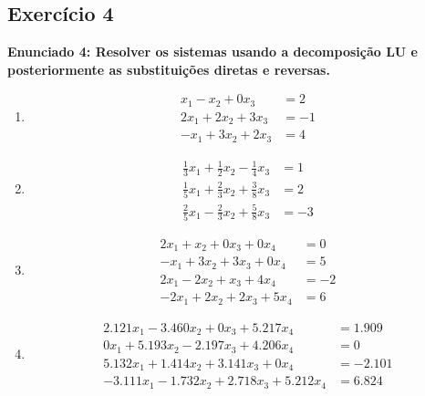 \documentclass{article}
\begin{document}
\subsection*{Exerc\'icio 4}
\textbf{Enunciado 4: Resolver os sistemas usando a decomposi\c{c}\~ao LU e posteriormente as substitui\c{c}\~oes diretas e reversas.}
\begin{enumerate}
    \item 
    \[
        \begin{aligned}
            x_1 - x_2 + 0x_3 &= 2 \\
            2x_1 + 2x_2 + 3x_3 &= -1 \\
            -x_1 + 3x_2 + 2x_3 &= 4
        \end{aligned}
    \]
    \item 
    \[
        \begin{aligned}
            \frac13x_1 + \frac12x_2 - \frac14x_3 &= 1 \\
            \frac15x_1 + \frac23x_2 + \frac38x_3 &= 2 \\
            \frac25x_1 - \frac23x_2 + \frac58x_3 &= -3
        \end{aligned}
    \]
    \item 
    \[
        \begin{aligned}
            2x_1 + x_2 + 0x_3 + 0x_4 &= 0 \\
            -x_1 + 3x_2 + 3x_3 + 0x_4 &= 5 \\
            2x_1 - 2x_2 + x_3 + 4x_4 &= -2 \\
            -2x_1 + 2x_2 + 2x_3 + 5x_4 &= 6
        \end{aligned}
    \]
    \item 
    \[
        \begin{aligned}
            2.121x_1 - 3.460x_2 + 0x_3 + 5.217x_4 &= 1.909 \\
            0x_1 + 5.193x_2 - 2.197x_3 + 4.206x_4 &= 0 \\
            5.132x_1 + 1.414x_2 + 3.141x_3 + 0x_4 &= -2.101 \\
            -3.111x_1 - 1.732x_2 + 2.718x_3 + 5.212x_4 &= 6.824
        \end{aligned}
    \]
\end{enumerate}

\end{document}
